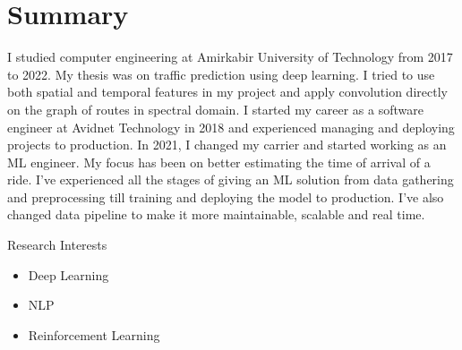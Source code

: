 \section{Summary}\closesection{}

I studied computer engineering at Amirkabir University of Technology from 2017 to 2022.
My thesis was on traffic prediction using deep learning.
I tried to use both spatial and temporal features in my project and apply
convolution directly on the graph of routes in spectral domain.
I started my career as a software engineer at Avidnet Technology in 2018 and experienced managing
and deploying projects to production.
In 2021, I changed my carrier and started working as an ML engineer.
My focus has been on better estimating the time of arrival of a ride.
I've experienced all the stages of giving an ML solution from data gathering and preprocessing
till training and deploying the model to production.
I've also changed data pipeline to make it more maintainable, scalable and real time.

\cventry
  {}
  {Research Interests}
  {}
  {}
  {}
  {}
\begin{itemize}
  \item Deep Learning
  \item NLP
  \item Reinforcement Learning
\end{itemize}
